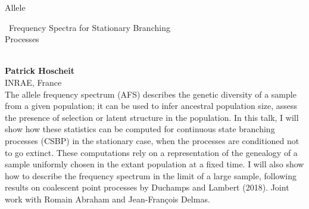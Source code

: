 \documentclass[12pt,a4paper]{article}
\newcommand{\ZAbst}{\rule[-1ex]{0pt}{2ex}\ } %
\begin{document}
\bigskip \bigskip  %

\noindent
{\Large Allele\ZAbst Frequency Spectra for Stationary Branching \\ Processes}\\[1ex]
{\large 
\textbf{Patrick Hoscheit}\\[1ex] INRAE, France}\\[2ex]
The allele frequency spectrum (AFS) describes the genetic diversity of a sample from a given population; it can be used to infer ancestral population size, assess the presence of selection or latent structure in the population. In this talk, I will show how these statistics can be computed for continuous state branching processes (CSBP) in the stationary case, when the processes are conditioned not to go extinct. These computations rely on a representation of the genealogy of a sample uniformly chosen in the extant population at a fixed time. I will also show how to describe the frequency spectrum in the limit of a large sample, following results on coalescent point processes by Duchamps and Lambert (2018). Joint work with Romain Abraham and Jean-François Delmas. 

\bigskip \bigskip  %
\end{document}
